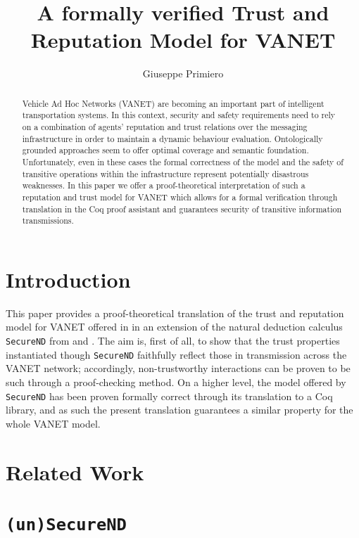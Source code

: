 \documentclass[]{llncs}
\title{A formally verified Trust and Reputation Model for VANET}
\author{Giuseppe Primiero}
\institute{Department of Computer Science\\Middlesex University London\\United Kingdom}
\begin{document}
\maketitle

\begin{abstract}
Vehicle Ad Hoc Networks (VANET) are becoming an important part of intelligent transportation systems. In this context, security and safety requirements need to rely on a combination of agents' reputation and trust relations over the messaging infrastructure in order to maintain a dynamic behaviour evaluation. Ontologically grounded approaches seem to offer optimal coverage and semantic foundation. Unfortunately, even in these cases the formal correctness of the model and the safety of transitive operations within the infrastructure represent potentially disastrous weaknesses. In this paper we offer a proof-theoretical interpretation of such a reputation and trust model for VANET which allows for a formal verification through translation in the Coq proof assistant and guarantees security of transitive information transmissions.
\end{abstract}


\section{Introduction}\label{sec:intro}

This paper provides a proof-theoretical translation of the trust and reputation model for VANET offered in \cite{xxx} in an extension of the natural deduction calculus \texttt{SecureND} from \cite{yyy} and \cite{zzz}. The aim is, first of all, to show that the trust properties instantiated though \texttt{SecureND} faithfully reflect those in transmission across the VANET network; accordingly, non-trustworthy interactions can be proven to be such through a proof-checking method. On a higher level, the model offered by \texttt{SecureND} has been proven formally correct through its translation to a Coq library, and as such the present translation guarantees a similar property for the whole VANET model.


\section{Related Work}\label{sec:related}


\section{\texttt{(un)SecureND}}\label{sec:logic}
\end{document}
